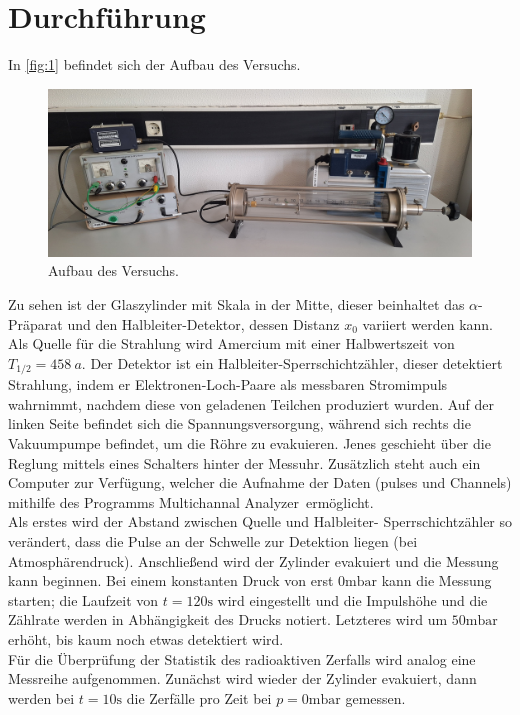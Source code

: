 \section{Durchführung}
\label{sec:Durchführung}

In \autoref{fig:1} befindet sich der Aufbau des Versuchs.
\begin{figure}[H]
    \centering
        \centering
        \includegraphics[width=\textwidth]{bilder/versuch.jpg}
        \caption{Aufbau des Versuchs.}
    \hfill
    \label{fig:1}
\end{figure}
\noindent Zu sehen ist der Glaszylinder mit Skala in der Mitte, dieser beinhaltet 
das $\alpha$-Präparat und den Halbleiter-Detektor, dessen Distanz $x_0$ variiert 
werden kann. Als Quelle für die Strahlung wird Amercium mit einer Halbwertszeit 
von $T_{1/2} = \SI{458}{a}$. Der Detektor ist ein Halbleiter-Sperrschichtzähler, 
dieser detektiert Strahlung, indem er Elektronen-Loch-Paare als messbaren 
Stromimpuls wahrnimmt, nachdem diese von geladenen Teilchen produziert wurden. 
Auf der linken Seite befindet sich die Spannungsversorgung, während sich rechts 
die Vakuumpumpe befindet, um die Röhre zu evakuieren. Jenes geschieht über 
die Reglung mittels eines Schalters hinter der Messuhr. Zusätzlich steht auch 
ein Computer zur Verfügung, welcher die Aufnahme der Daten (pulses und Channels)
mithilfe des Programms \glqq Multichannal Analyzer\grqq \, ermöglicht.
\vspace{0.5em}
\\
\noindent Als erstes wird der Abstand zwischen Quelle und Halbleiter-
Sperrschichtzähler so verändert, dass die Pulse an der Schwelle zur Detektion
liegen (bei Atmosphärendruck). Anschließend wird der Zylinder evakuiert und 
die Messung kann beginnen. Bei einem konstanten Druck von erst $0 \unit{\milli\bar}$
kann die Messung starten; die Laufzeit von $t = 120 \unit{\second}$ wird eingestellt 
und die Impulshöhe und die Zählrate werden in Abhängigkeit des Drucks notiert. 
Letzteres wird um $50 \unit{\milli\bar}$ erhöht, bis kaum noch etwas detektiert 
wird.
\vspace{0.5em}
\\
\noindent Für die Überprüfung der Statistik des radioaktiven Zerfalls wird 
analog eine Messreihe aufgenommen. Zunächst wird wieder der Zylinder evakuiert, 
dann werden bei $t = 10 \unit{\second}$ die Zerfälle pro Zeit bei $p = 0 \unit{\milli\bar}$
gemessen.